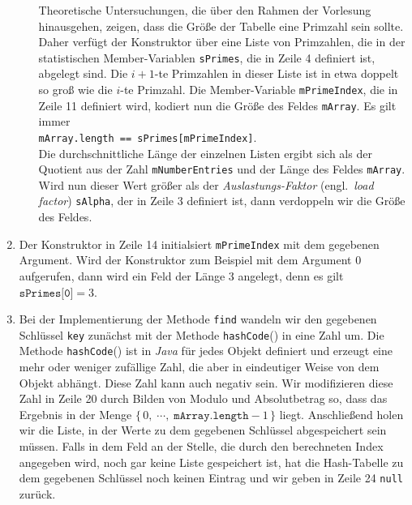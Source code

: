 \begin{enumerate}
\begin{enumerate}
            Theoretische Untersuchungen, die \"uber den Rahmen der Vorlesung hinausgehen, zeigen, dass
            die Gr\"o{\ss}e der Tabelle eine Primzahl sein sollte.  Daher verf\"ugt der
            Konstruktor \"uber eine Liste von Primzahlen, 
            die in der statistischen Member-Variablen \texttt{sPrimes}, die in Zeile 4
            definiert ist, abgelegt sind.  
            Die $i+1$-te Primzahlen in dieser Liste ist in etwa doppelt so gro{\ss} wie die $i$-te
            Primzahl. Die Member-Variable \texttt{mPrimeIndex}, die
            in Zeile 11 definiert wird, kodiert nun die Gr\"o{\ss}e des
            Feldes \texttt{mArray}.  Es gilt immer \\[0.2cm]
            \hspace*{1.3cm} \texttt{mArray.length == sPrimes[mPrimeIndex]}. \\[0.2cm]
            Die durchschnittliche L\"ange der einzelnen Listen ergibt sich als
            der Quotient aus der Zahl \texttt{mNumberEntries} und der L\"ange des Feldes
            \texttt{mArray}.  Wird nun dieser Wert gr\"o{\ss}er als der
            \emph{Auslastungs-Faktor} (engl.~\emph{load factor})             
            \texttt{sAlpha}, der in Zeile 3 definiert ist, dann verdoppeln wir die Gr\"o{\ss}e
            des Feldes.
      \end{enumerate}
\item Der Konstruktor in Zeile 14 initialsiert \texttt{mPrimeIndex} mit dem gegebenen Argument.
      Wird der Konstruktor zum Beispiel mit dem Argument 0 aufgerufen, dann wird ein Feld
      der L\"ange 3 angelegt, denn es gilt $\texttt{sPrimes[0]} = 3$.
\item Bei der Implementierung der Methode \texttt{find} wandeln wir den gegebenen Schl\"ussel 
      \texttt{key} zun\"achst mit der Methode \texttt{hashCode}() in eine Zahl um.  
      Die Methode \texttt{hashCode}() ist in \textsl{Java} f\"ur jedes Objekt definiert
      und erzeugt eine mehr oder weniger zuf\"allige Zahl, die aber in eindeutiger Weise
      von dem Objekt abh\"angt.  Diese Zahl kann auch negativ sein.
      Wir modifizieren diese Zahl in Zeile 20 durch Bilden von Modulo und Absolutbetrag
      so, dass das Ergebnis in der Menge 
      $\{\,0,\; \cdots,\; \mathtt{mArray.length} - 1\,\}$ liegt.
      Anschlie{\ss}end holen wir die Liste, in der Werte zu dem gegebenen Schl\"ussel
      abgespeichert sein m\"ussen.  Falls in dem Feld an der Stelle, die durch den berechneten 
      Index angegeben wird, noch gar keine Liste gespeichert ist,
      hat die Hash-Tabelle zu dem gegebenen Schl\"ussel noch keinen Eintrag und wir geben in
      Zeile 24 \texttt{null} zur\"uck.


\end{enumerate}
